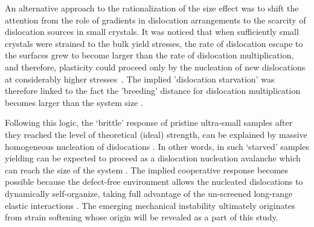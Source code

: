 \documentclass[CRPHYS,Unicode,manuscript]{cedram}
\begin{document}
An alternative approach to  the rationalization of the size effect was to shift the attention  from the role of  gradients in dislocation arrangements to the scarcity of dislocation sources in small crystals. It was noticed that when  sufficiently small crystals were strained to the bulk yield stresses, the rate of dislocation escape to the surfaces grew to become larger than the rate of dislocation multiplication, and therefore, plasticity could  proceed only  by the nucleation of new dislocations at considerably higher stresses~\cite{Shan2008-nh}. The implied 'dislocation starvation' was therefore linked to the fact   the 'breeding' distance for dislocation multiplication becomes  larger than the system size \cite{Rao2008-df,Weinberger2008-qw,Greer2011-av,Bagheripoor2018-nt,Shan2008-nh,Mordehai2011-ys,Shan2008-nh}. 

Following this logic,   the `brittle' response of pristine ultra-small samples after they reached the level of theoretical (ideal) strength,   can be explained by   massive homogeneous nucleation of  dislocations \cite{Plans2007-cx,Miller2008-rr,Garg2016-kz}. In other words, in such `starved' samples   yielding can be expected to proceed as   a dislocation nucleation avalanche which can reach the size of the system \cite{Kiener2011-hc,Oh2009-uf,Benzerga2009-ny,Lee2011-oi,Ng2009-cc}. The implied  cooperative response becomes possible because the defect-free environment allows the nucleated dislocations to dynamically self-organize, taking full advantage of the un-screened  long-range elastic interactions \cite{Miguel2001-fi,Koslowski2004-sa,Uchic2009-rj}. The emerging  mechanical instability ultimately  originates from  strain softening whose origin   will be  revealed as  a part of this study.
\end{document}
